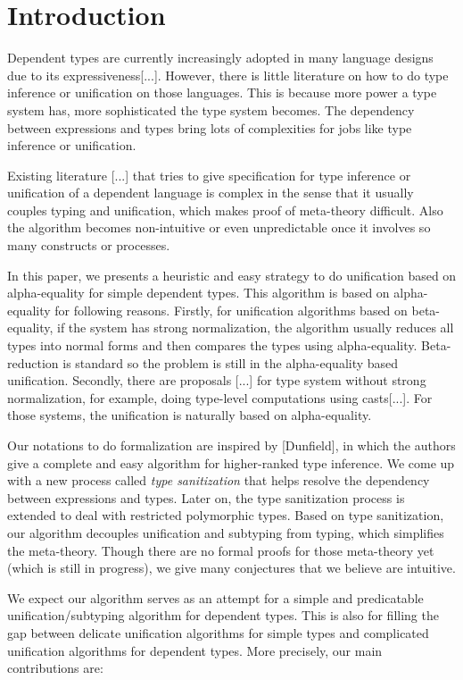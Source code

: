 \section{Introduction}

Dependent types are currently increasingly adopted in many language
designs due to its expressiveness[...]. However, there is little literature on
how to do type inference or unification on those languages. This is because
more power a type system has, more sophisticated the type system
becomes. The dependency between expressions and types bring lots of complexities
for jobs like type inference or unification.

Existing literature [...] that tries to give specification for type inference
or unification of
a dependent language is complex in the sense that it usually couples typing
and unification, which makes proof of meta-theory difficult.
Also the algorithm becomes non-intuitive or even unpredictable once it involves
so many constructs or processes.

In this paper, we presents a heuristic and easy strategy to do unification based on
alpha-equality for simple dependent
types. This algorithm is based on alpha-equality for following reasons. Firstly,
for unification algorithms based on beta-equality, if the system has strong
normalization, the algorithm usually reduces all types into normal forms and
then compares the types using
alpha-equality. Beta-reduction is standard so the problem is still in the
alpha-equality based unification.
Secondly, there are proposals [...] for type system without strong
normalization, for example, doing type-level computations using casts[...]. For
those systems, the unification is naturally based on alpha-equality.

Our notations to do formalization are inspired by [Dunfield],
in which the authors give a complete
and easy algorithm for higher-ranked type inference. We come up with a new
process called \textit{type sanitization} that helps resolve the dependency
between expressions and types. Later on, the type sanitization process is
extended to deal with restricted polymorphic types.
Based on type sanitization, our algorithm
decouples unification and subtyping from typing, which simplifies the
meta-theory. Though there are no formal proofs for those meta-theory yet (which
is still in progress),
we give many conjectures that we believe are intuitive.

We expect our algorithm serves as an attempt
for a simple and predicatable unification/subtyping algorithm for dependent
types. This is also for
filling the gap between
delicate unification algorithms for simple types
and
complicated unification algorithms for dependent types.
More precisely, our main contributions are:

